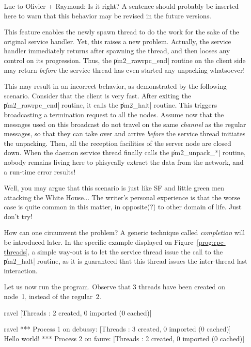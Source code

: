 \begin{note}
  Luc to Olivier + Raymond: Is it right? A sentence should probably be
  inserted here to warn that this behavior may be revised in the
  future versions.
\end{note}

This feature enables the newly spawn thread to do the work for the
sake of the original service handler. Yet, this raises a new
problem. Actually, the service handler immediately returns after
spawning the thread, and then looses any control on its
progression. Thus, the \|pm2_rawrpc_end| routine on the client side
may return \emph{before} the service thread has even started any
unpacking whatsoever! 

This may result in an incorrect behavior, as demonstrated by the
following scenario. Consider that the client is very fast. After
exiting the \|pm2_rawrpc_end| routine, it calls the \|pm2_halt|
routine. This triggers broadcasting a termination request to all the
nodes. Assume now that the messages used on this broadcast do not
travel on the same \emph{channel} as the regular messages, so that
they can take over and arrive \emph{before} the service thread
initiates the unpacking. Then, all the reception facilities of the
server node are closed down. When the daemon service thread finally
calls the \|pm2_unpack_*| routine, nobody remains living here to
phisycally extract the data from the network, and a run-time error
results!

Well, you may argue that this scenario is just like SF and little
green men attacking the White House... The writer's personal
experience is that the worse case is quite common in this matter, in
opposite(?) to other domain of life. Just don't try!

How can one circumvent the problem? A generic technique called
\emph{completion} will be introduced later. In the specific example
displayed on Figure~\ref{prog:rpc-threads}, a simple way-out is to let
the service thread issue the call to the \|pm2_halt| routine, as it is
guaranteed that this thread issues the inter-thread last interaction.

Let us now run the program. Observe that 3 threads have been
created on node~1, instead of the regular~2.
\begin{shell}
ravel%
[Threads : 2 created, 0 imported (0 cached)]

ravel%
*** Process 1 on debussy:
[Threads : 3 created, 0 imported (0 cached)]
Hello world!
*** Process 2 on faure:
[Threads : 2 created, 0 imported (0 cached)]
\end{shell}


